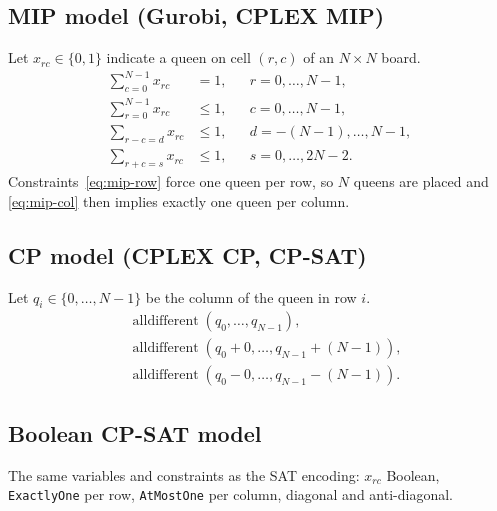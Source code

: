 
\subsection{MIP model (Gurobi, CPLEX MIP)}
Let $x_{rc}\in\{0,1\}$ indicate a queen on cell $(r,c)$ of an $N\times N$ board.
\begin{align}
  \sum_{c=0}^{N-1} x_{rc} &= 1, && r = 0,\dots,N-1, \label{eq:mip-row}\\
  \sum_{r=0}^{N-1} x_{rc} &\le 1, && c = 0,\dots,N-1, \label{eq:mip-col}\\
  \sum_{r-c=d} x_{rc} &\le 1, && d = -(N-1),\dots,N-1, \label{eq:mip-diag}\\
  \sum_{r+c=s} x_{rc} &\le 1, && s = 0,\dots,2N-2. \label{eq:mip-anti}
\end{align}
Constraints~\eqref{eq:mip-row} force one queen per row, so $N$ queens are placed and
\eqref{eq:mip-col} then implies exactly one queen per column.

\subsection{CP model (CPLEX CP, CP-SAT)}
Let $q_i\in\{0,\dots,N-1\}$ be the column of the queen in row $i$.
\begin{align}
  &\operatorname{alldifferent}(q_0,\dots,q_{N-1}), \label{eq:cp-col}\\
  &\operatorname{alldifferent}(q_0+0,\dots,q_{N-1}+(N-1)), \label{eq:cp-diag}\\
  &\operatorname{alldifferent}(q_0-0,\dots,q_{N-1}-(N-1)). \label{eq:cp-anti}
\end{align}

\subsection{Boolean CP-SAT model}
The same variables and constraints as the SAT encoding: $x_{rc}$ Boolean,
\texttt{ExactlyOne} per row, \texttt{AtMostOne} per column, diagonal and anti-diagonal.
